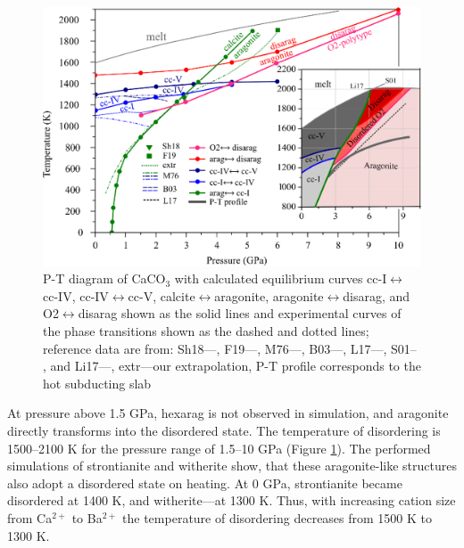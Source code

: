 \documentclass[journal=jacsat,manuscript=article]{achemso}
\begin{document}
\begin{figure}[H]
\includegraphics[width=\textwidth]{phdia} \centering
\caption{P-T diagram of CaCO$_3$ with calculated equilibrium curves cc-I$\leftrightarrow$cc-IV, cc-IV$\leftrightarrow$cc-V,  calcite$\leftrightarrow$aragonite, aragonite$\leftrightarrow$disarag, and O2$\leftrightarrow$disarag shown as the solid lines and experimental curves of the phase transitions shown as the dashed and dotted lines; reference data are from: Sh18---\cite{shatskiy2018}, F19---\cite{fedoraeva2019}, M76---\cite{mirwald1976}, B03---\cite{bagdassarov2003}, L17---\cite{litasov2017}, S01-- \cite{suito2001}, and Li17---\cite{li2017}, extr---our extrapolation, P-T profile corresponds to the hot subducting slab \cite{syracuse2010} } \label{phdia}
\end{figure}


At pressure above 1.5 GPa, hexarag is not observed in simulation, and aragonite directly transforms into the disordered state. 
The temperature of disordering is 1500--2100 K for the pressure range of 1.5--10 GPa (Figure \ref{phdia}). 
The performed simulations of strontianite and witherite show, that these aragonite-like structures also adopt a disordered state on heating. 
At 0 GPa, strontianite became disordered at 1400 K, and witherite---at 1300 K. 
Thus, with increasing cation size from Ca$^{2+}$ to Ba$^{2+}$ the temperature of disordering decreases from 1500 K to 1300 K. 
\end{document}
